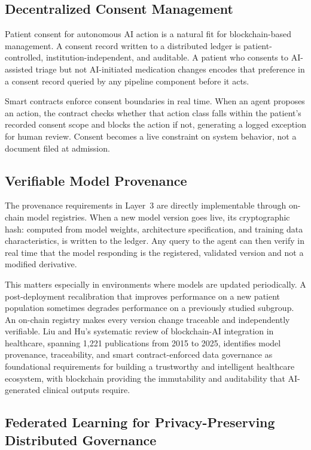\documentclass[12pt,a4paper]{article}
\begin{document}
\subsection*{Decentralized Consent Management}

Patient consent for autonomous AI action is a natural fit for
blockchain-based management. A consent record written to a
distributed ledger is patient-controlled, institution-independent,
and auditable. A patient who consents to AI-assisted triage but
not AI-initiated medication changes encodes that preference in a
consent record queried by any pipeline component before it acts.

Smart contracts enforce consent boundaries in real time. When an
agent proposes an action, the contract checks whether that action
class falls within the patient's recorded consent scope and blocks
the action if not, generating a logged exception for human review.
Consent becomes a live constraint on system behavior, not a
document filed at admission.

\subsection*{Verifiable Model Provenance}

The provenance requirements in Layer~3 are directly implementable
through on-chain model registries. When a new model version goes
live, its cryptographic hash: computed from model weights,
architecture specification, and training data characteristics, is
written to the ledger. Any query to the agent can then verify in
real time that the model responding is the registered, validated
version and not a modified derivative.

This matters especially in environments where models are updated
periodically. A post-deployment recalibration that improves
performance on a new patient population sometimes degrades
performance on a previously studied subgroup. An on-chain
registry makes every version change traceable and independently
verifiable. Liu and Hu's systematic review of blockchain-AI
integration in healthcare, spanning 1,221 publications from 2015
to 2025, identifies model provenance, traceability, and smart
contract-enforced data governance as foundational requirements
for building a trustworthy and intelligent healthcare ecosystem,
with blockchain providing the immutability and auditability that
AI-generated clinical outputs require.\cite{liu2026}

\subsection*{Federated Learning for Privacy-Preserving Distributed
Governance}
\end{document}
